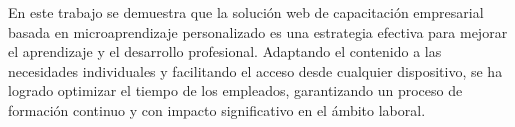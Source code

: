 \blindtext


En este trabajo se demuestra que la solución web de capacitación empresarial basada en microaprendizaje personalizado es una estrategia efectiva
para mejorar el aprendizaje y el desarrollo profesional. Adaptando el contenido a las necesidades individuales y facilitando el
acceso desde cualquier dispositivo, se ha logrado optimizar el tiempo de los empleados, garantizando un proceso de formación
continuo y con impacto significativo en el ámbito laboral.